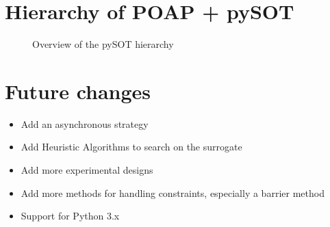 \documentclass[]{article}
\begin{document}
\section{Hierarchy of POAP + pySOT}
\begin{figure}[!ht] 
	\centering
	\caption{Overview of the pySOT hierarchy} 
\end{figure}
\FloatBarrier

\section{Future changes}
\begin{itemize}
\item Add an asynchronous strategy
\item Add Heuristic Algorithms to search on the surrogate
\item Add more experimental designs
\item Add more methods for handling constraints, especially a barrier method
\item Support for Python 3.x
\end{itemize}



\end{document}
